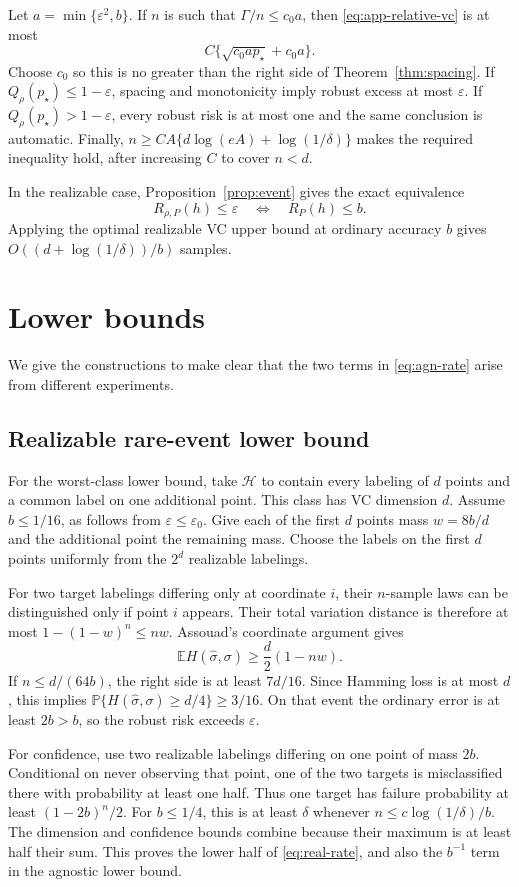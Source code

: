 \documentclass{article}
\theoremstyle{remark}
\newcommand{\E}{\mathbb E}
\newcommand{\Pp}{\mathbb P}
\newcommand{\cH}{\mathcal H}
\newcommand{\eps}{\varepsilon}
\begin{document}
Let $a=\min\{\eps^2,b\}$.  If $n$ is such that
$\Gamma/n\le c_0a$, then \eqref{eq:app-relative-vc} is at most
\[
 C\{\sqrt{c_0ap_\star}+c_0a\}.
\]
Choose $c_0$ so this is no greater than the right side of
Theorem~\ref{thm:spacing}.  If $Q_\rho(p_\star)\le1-\eps$, spacing and
monotonicity imply robust excess at most $\eps$.  If
$Q_\rho(p_\star)>1-\eps$, every robust risk is at most one and the same
conclusion is automatic.  Finally,
$n\ge CA\{d\log(eA)+\log(1/\delta)\}$ makes the required inequality hold,
after increasing $C$ to cover $n<d$.

In the realizable case, Proposition~\ref{prop:event} gives the exact
equivalence
\[
 R_{\rho,P}(h)\le\eps\quad\Longleftrightarrow\quad R_P(h)\le b.
\]
Applying the optimal realizable VC upper bound at ordinary accuracy $b$ gives
$O((d+\log(1/\delta))/b)$ samples.

\section{Lower bounds}
\label{app:lower}

We give the constructions to make clear that the two terms in
\eqref{eq:agn-rate} arise from different experiments.

\subsection{Realizable rare-event lower bound}

For the worst-class lower bound, take $\cH$ to contain every labeling of $d$
points and a common label on one additional point.  This class has VC
dimension $d$.  Assume $b\le1/16$, as follows from $\eps\le\eps_0$.  Give each
of the first $d$ points mass $w=8b/d$ and the additional point the remaining
mass.  Choose the labels on the first $d$ points uniformly from the $2^d$
realizable labelings.

For two target labelings differing only at coordinate $i$, their $n$-sample
laws can be distinguished only if point $i$ appears.  Their total variation
distance is therefore at most $1-(1-w)^n\le nw$.  Assouad's coordinate
argument gives
\[
 \E H(\widehat\sigma,\sigma)
 \ge\frac d2(1-nw).
\]
If $n\le d/(64b)$, the right side is at least $7d/16$.  Since Hamming loss is
at most $d$, this implies
$\Pp\{H(\widehat\sigma,\sigma)\ge d/4\}\ge3/16$.  On that event the ordinary
error is at least $2b>b$, so the robust risk exceeds $\eps$.

For confidence, use two realizable labelings differing on one point of mass
$2b$.  Conditional on never observing that point, one of the two targets is
misclassified there with probability at least one half.  Thus one target has
failure probability at least $(1-2b)^n/2$.  For $b\le1/4$, this is at least
$\delta$ whenever $n\le c\log(1/\delta)/b$.  The dimension and confidence
bounds combine because their maximum is at least half their sum.  This proves
the lower half of \eqref{eq:real-rate}, and also the $b^{-1}$ term in the
agnostic lower bound.
\end{document}
